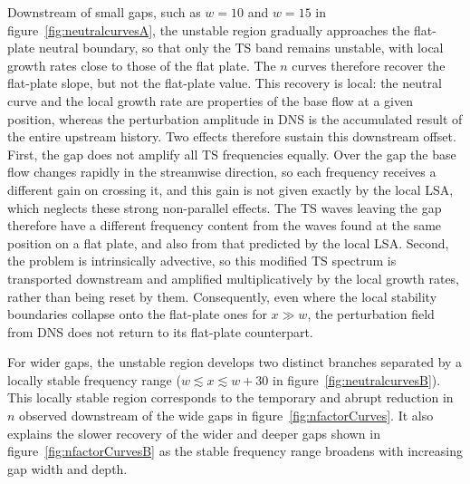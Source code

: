 \documentclass[lineno]{jfm}
\begin{document}
Downstream of small gaps, such as $w=10$ and $w=15$ in figure~\ref{fig:neutralcurvesA}, the unstable region gradually approaches the flat-plate neutral boundary, so that only the \ac{TS} band remains unstable, with local growth rates close to those of the flat plate. The $n$ curves therefore recover the flat-plate slope, but not the flat-plate value. This recovery is local: the neutral curve and the local growth rate are properties of the base flow at a given position, whereas the perturbation amplitude in \ac{DNS} is the accumulated result of the entire upstream history. Two effects therefore sustain this downstream offset. First, the gap does not amplify all \ac{TS} frequencies equally. Over the gap the base flow changes rapidly in the streamwise direction, so each frequency receives a different gain on crossing it, and this gain is not given exactly by the local \ac{LSA}, which neglects these strong non-parallel effects. The \ac{TS} waves leaving the gap therefore have a different frequency content from the waves found at the same position on a flat plate, and also from that predicted by the local \ac{LSA}. Second, the problem is intrinsically advective, so this modified \ac{TS} spectrum is transported downstream and amplified multiplicatively by the local growth rates, rather than being reset by them. Consequently, even where the local stability boundaries collapse onto the flat-plate ones for $x\gg w$, the perturbation field from \ac{DNS} does not return to its flat-plate counterpart.

For wider gaps, the unstable region develops two distinct branches separated by a locally stable frequency range ($w\lesssim x\lesssim w+30$ in figure~\ref{fig:neutralcurvesB}). This locally stable region corresponds to the temporary and abrupt reduction in $n$ observed downstream of the wide gaps in figure~\ref{fig:nfactorCurves}. It also explains the slower recovery of the wider and deeper gaps shown in figure~\ref{fig:nfactorCurvesB} as the stable frequency range broadens with increasing gap width and depth.
\end{document}
